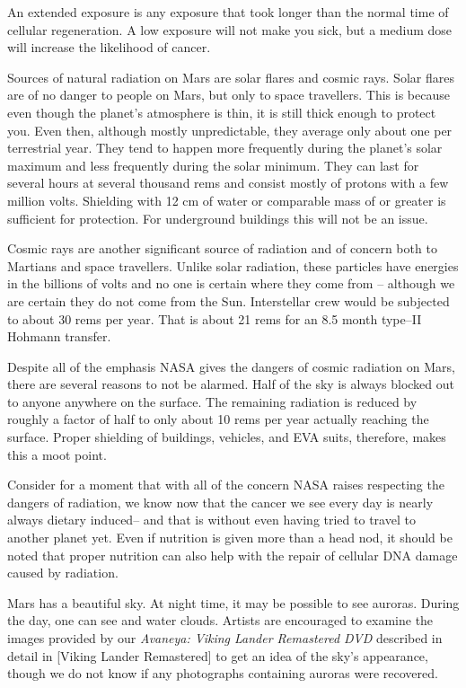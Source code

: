 An extended exposure is any exposure that took longer than the normal time of cellular regeneration. A low exposure will not make you sick, but a medium dose will increase the likelihood of cancer.

Sources of natural radiation on Mars are solar flares and cosmic rays. Solar flares are of no danger to people on Mars, but only to space travellers. This is because even though the planet's atmosphere is thin, it is still thick enough to protect you. Even then, although mostly unpredictable, they average only about one per terrestrial year. They tend to happen more frequently during the planet's solar maximum and less frequently during the solar minimum. They can last for several hours at several thousand rems and consist mostly of protons with a few million volts. Shielding with 12 cm of water or comparable mass of  or greater is sufficient for protection. For underground buildings this will not be an issue.

Cosmic rays are another significant source of radiation and of concern both to Martians and space travellers. Unlike solar radiation, these particles have energies in the billions of volts and no one is certain where they come from -- although we are certain they do not come from the Sun. Interstellar crew would be subjected to about 30 rems per year. That is about 21 rems for an 8.5 month type--II Hohmann transfer.

Despite all of the emphasis NASA gives the dangers of cosmic radiation on Mars, there are several reasons to not be alarmed. Half of the sky is always blocked out to anyone anywhere on the surface. The remaining radiation is reduced by roughly a factor of half to only about 10 rems per year actually reaching the surface. Proper shielding of buildings, vehicles, and EVA suits, therefore, makes this a moot point.

Consider for a moment that with all of the concern NASA raises respecting the dangers of radiation, we know now that the cancer we see every day is nearly always dietary induced -- and that is without even having tried to travel to another planet yet. Even if nutrition is given more than a head nod, it should be noted that proper nutrition can also help with the repair of cellular DNA damage caused by radiation.\footnotecite[cavusoglu2009]

Mars has a beautiful sky. At night time, it may be possible to see auroras. During the day, one can see  and water clouds. Artists are encouraged to examine the images provided by our {\it Avaneya: Viking Lander Remastered DVD} described in detail in [Viking Lander Remastered] to get an idea of the sky's appearance, though we do not know if any photographs containing auroras were recovered.

